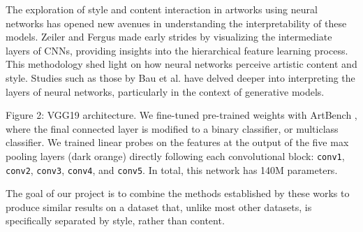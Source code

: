 \documentclass[twocolumn]{article}
\begin{document}

The exploration of style and content interaction in artworks using neural networks has opened new avenues in understanding the interpretability of these models. Zeiler and Fergus \cite{zeilerVisualizingUnderstandingConvolutional2013} made early strides by visualizing the intermediate layers of CNNs, providing insights into the hierarchical feature learning process. This methodology shed light on how neural networks perceive artistic content and style. Studies such as those by Bau et al. \cite{bauNetworkDissectionQuantifying2017} have delved deeper into interpreting the layers of neural networks, particularly in the context of generative models. 

\begin{strip}
\begin{figure}[H]

\end{figure}
\vspace{-1.25cm}
\label{fig:VGG19}
Figure 2: VGG19 architecture. We fine-tuned pre-trained weights with ArtBench \cite{liaoArtBenchDatasetBenchmarking2022a}, where the final connected layer is modified to a binary classifier, or multiclass classifier. We trained linear probes on the features at the output of the five max pooling layers (dark orange) directly following each convolutional block: \verb|conv1|, \verb|conv2|, \verb|conv3|, \verb|conv4|, and \verb|conv5|. In total, this network has 140M parameters.
\end{strip}

The goal of our project is to combine the methods established by these works to produce similar results on a dataset that, unlike most other datasets, is specifically separated by style, rather than content. 
\end{document}
